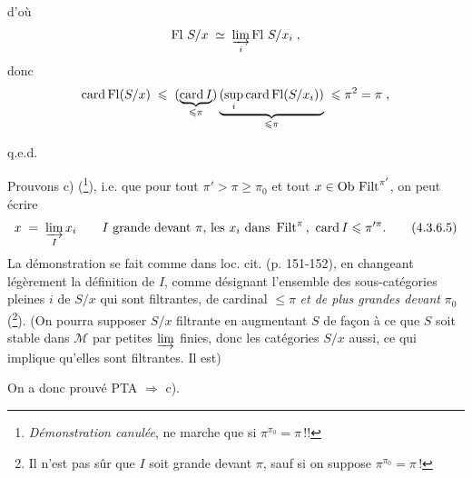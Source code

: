 \setcounter{footnote}{11}


d'où
\[
\operatorname{Fl}\,S/x \;\simeq\; \varinjlim_{i} \operatorname{Fl}\,S/x_i \;,
\]
donc
\[
\operatorname{card}\operatorname{Fl}(S/x) \;\leqslant\; (\underbrace{\operatorname{card} I}_{\leqslant\pi})\underbrace{(\sup_{i}\operatorname{card}\operatorname{Fl}(S/x_i))}_{\leqslant\pi} \;\leqslant \pi^2 = \pi \;,
\]

\hfill q.e.d.

Prouvons c) (\footnote{\textit{Démonstration canulée}, ne marche que si $\pi^{\pi_0} = \pi$\,!!}), i.e. que pour tout $\pi' > \pi \geqslant \pi_0$ et tout $x \in \mathrm{Ob}\,\operatorname{Filt}^{\pi'}$, on peut écrire
\[
x \;=\; \varinjlim_{I} x_i \qquad I \text{ grande devant } \pi\text{, les } x_i \text{ dans } \operatorname{Filt}^{\pi}\text{, } \operatorname{card} I \leqslant \pi'^{\pi}. \tag*{(4.3.6.5)}
\]
La démonstration se fait comme dans loc. cit. (p. 151-152), en changeant légèrement la définition de $I$, comme désignant l'ensemble des sous-catégories pleines $i$ de $S/x$ qui sont filtrantes, de cardinal $\leqslant \pi$ \textit{et de plus grandes devant} $\pi_0$ (\footnote{Il n'est pas sûr que $I$ soit grande devant $\pi$, sauf si on suppose $\pi^{\pi_0} = \pi$\,!}). (On pourra supposer $S/x$ filtrante en augmentant $S$ de façon à ce que $S$ soit stable dans $\mathcal{M}$ par petites $\varinjlim$ finies, donc les catégories $S/x$ aussi, ce qui implique qu'elles sont filtrantes. Il est)

On a donc prouvé PTA $\Longrightarrow$ c).

